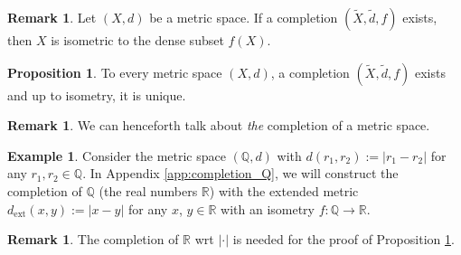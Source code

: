\documentclass[12pt, a4paper]{article}
\numberwithin{equation}{section}
\theoremstyle{definition}
\theoremstyle{definition}
\newtheorem{exmp}[thm]{Example} %
\newtheorem{remark}[thm]{Remark} %
\newtheorem{proposition}[thm]{Proposition}
\newcommand{\abs}[1]{\left\vert #1 \right\vert}
\begin{document}
	\begin{remark}
		Let $(X, d)$ be a metric space. If a completion $\left(\tilde{X}, \tilde{d}, f\right)$ exists, then $X$ is isometric to the dense subset $f(X)$.
	\end{remark}
	
	\begin{proposition}\label{prop:completion_of_metric_space_exists}
		To every metric space $(X, d)$, a completion $\left(\tilde{X}, \tilde{d}, f\right)$ exists and up to isometry, it is unique.
	\end{proposition}

	\begin{remark}
		We can henceforth talk about \textit{the} completion of a metric space.
	\end{remark}
	
	\begin{exmp}
		Consider the metric space $(\mathbb Q, d)$ with $d(r_1, r_2) := \abs{r_1 - r_2}$ for any $r_1, r_2\in\mathbb Q$. In Appendix \ref{app:completion_Q}, we will construct the completion of $\mathbb Q$ (the real numbers $\mathbb R$) with the extended metric $d_{\text{ext}}(x, y) := \abs{x - y}$ for any $x$, $y\in\mathbb R$ with an isometry $f:\mathbb Q\to\mathbb R$.
	\end{exmp}

	\begin{remark}
		The completion of $\mathbb R$ wrt $\abs{\cdot}$ is needed for the proof of Proposition \ref{prop:completion_of_metric_space_exists}.
	\end{remark}
\end{document}
